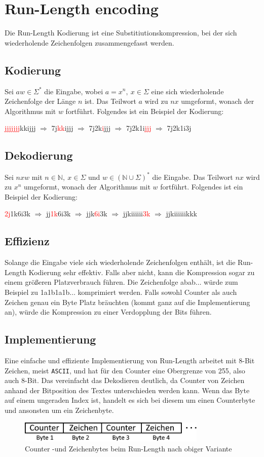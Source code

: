 \documentclass{article}
\newcommand{\R}{\Rightarrow}
\newcommand{\bb}[1]{\mathbb{{#1}}}
\newcommand{\red}{\textcolor{red}}
\begin{document}
\section{Run-Length encoding} 
Die Run-Length Kodierung ist eine Substitiutionskompression, bei der sich wiederholende
Zeichenfolgen zusammengefasst werden.
\subsection{Kodierung}
Sei $aw \in \Sigma^*$ die Eingabe, wobei $a = x^n,~x\in \Sigma$ eine
sich wiederholende Zeichenfolge der Länge $n$ ist. Das Teilwort $a$ wird zu $nx$ umgeformt, 
wonach der Algorithmus mit $w$ fortführt. Folgendes ist ein Beispiel der Kodierung:
\begin{center}
    \red{jjjjjjj}kkijjj $\R$ 7j\red{kk}ijjj $\R$ 7j2k\red{i}jjj $\R$ 7j2k1i\red{jjj} $\R$ 7j2k1i3j
\end{center}
\subsection{Dekodierung}
Sei $nxw$ mit $n\in \bb{N},~x\in\Sigma$ und $w\in(\bb{N}\cup\Sigma)^*$ die Eingabe. Das Teilwort $nx$ wird
zu $x^n$ umgeformt, wonach der Algorithmus mit $w$ fortführt. Folgendes ist ein Beispiel der Kodierung:
\begin{center}
    \red{2j}1k6i3k $\R$ jj\red{1k}6i3k $\R$ jjk\red{6i}3k $\R$ jjkiiiiii\red{3k} $\R$ jjkiiiiiikkk
\end{center}
\subsection{Effizienz}
Solange die Eingabe viele sich wiederholende Zeichenfolgen enthält, ist die Run-Length 
Kodierung sehr effektiv. Falls aber nicht, kann die Kompression sogar zu einem größeren 
Platzverbrauch führen. 
Die Zeichenfolge \textsf{abab}$\dots$ würde zum Beispiel zu \textsf{1a1b1a1b}$\dots$ komprimiert werden. 
Falls sowohl Counter als auch Zeichen genau ein Byte Platz bräuchten (kommt ganz auf die
Implementierung an), würde die Kompression zu einer Verdopplung der Bits führen.
\subsection{Implementierung}
Eine einfache und effiziente Implementierung von Run-Length arbeitet mit 8-Bit Zeichen, meist \texttt{ASCII},
und hat für den Counter eine Obergrenze von 255, also auch 8-Bit. Das vereinfacht das 
Dekodieren deutlich, da Counter von Zeichen anhand der Bitposition des Textes unterschieden
werden kann. Wenn das Byte auf einem ungeraden Index ist, handelt es sich bei diesem 
um einen Counterbyte und ansonsten um ein Zeichenbyte.
\begin{figure}[H]
    \centering
    \includegraphics*[width=0.8\textwidth]{images/bytesteps.png}
    \caption[Counter -und Zeichenbytes beim Run-Length]{
        Counter -und Zeichenbytes beim Run-Length nach obiger Variante
    }
\end{figure}
\end{document}
